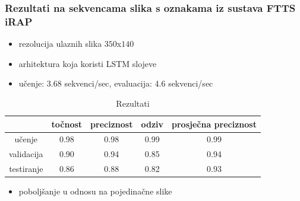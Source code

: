 \documentclass{beamer}
\begin{document}
\begin{frame}
 \frametitle{Rezultati na sekvencama slika s oznakama iz sustava FTTS iRAP}
 \begin{itemize}
  \item rezolucija ulaznih slika $350$x$140$
  \item arhitektura koja koristi LSTM slojeve
  \item učenje: 3.68 sekvenci/sec, evaluacija: 4.6 sekvenci/sec
 \end{itemize}
 
\begin{table}[H]
\centering
\caption{Rezultati}
\label{score:lstm}
\begin{tabular}{c|c|c|c|c|}
\cline{2-5}
                                            & točnost & preciznost & odziv & prosječna preciznost \\ \hline
\multicolumn{1}{|c|}{učenje}     & 0.98       & 0.98        & 0.99     &           0.99           \\ \hline
\multicolumn{1}{|c|}{validacija} & 0.90       & 0.94        & 0.85     &            0.94          \\ \hline
\multicolumn{1}{|c|}{testiranje} & 0.86       & 0.88        & 0.82     &            0.93          \\ \hline
\end{tabular}
\end{table}

\begin{itemize}
 \item poboljšanje u odnosu na pojedinačne slike
\end{itemize}


\end{frame}
\end{document}
